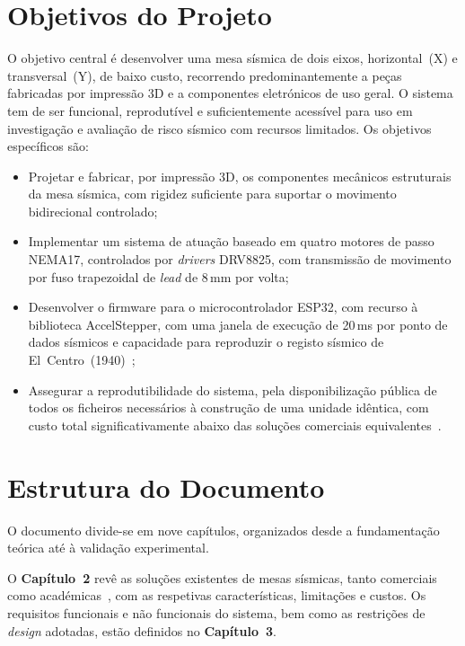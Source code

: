 \section{Objetivos do Projeto}
\label{sec:objetivos}

O objetivo central é desenvolver uma mesa sísmica de dois eixos, horizontal~(X) e transversal~(Y), de baixo custo, recorrendo predominantemente a peças fabricadas por impressão 3D e a componentes eletrónicos de uso geral. O sistema tem de ser funcional, reprodutível e suficientemente acessível para uso em investigação e avaliação de risco sísmico com recursos limitados. Os objetivos específicos são:

\begin{itemize}
    \item Projetar e fabricar, por impressão 3D, os componentes mecânicos estruturais da mesa sísmica, com rigidez suficiente para suportar o movimento bidirecional controlado;
    \item Implementar um sistema de atuação baseado em quatro motores de passo NEMA17, controlados por \textit{drivers} DRV8825, com transmissão de movimento por fuso trapezoidal de \textit{lead} de 8\,mm por volta;
    \item Desenvolver o firmware para o microcontrolador ESP32, com recurso à biblioteca AccelStepper, com uma janela de execução de 20\,ms por ponto de dados sísmicos e capacidade para reproduzir o registo sísmico de El~Centro~(1940)~\cite{Damci2018};
    \item Assegurar a reprodutibilidade do sistema, pela disponibilização pública de todos os ficheiros necessários à construção de uma unidade idêntica, com custo total significativamente abaixo das soluções comerciais equivalentes~\cite{QuanserShakeTableIIXY}.
\end{itemize}

\section{Estrutura do Documento}
\label{sec:estrutura}

O documento divide-se em nove capítulos, organizados desde a fundamentação teórica até à validação experimental.

O \textbf{Capítulo~2} revê as soluções existentes de mesas sísmicas, tanto comerciais~\cite{QuanserShakeTableIIXY, QuanserShakeTableIII} como académicas~\cite{Damci2018, Shakebot2022, 2DOF2025}, com as respetivas características, limitações e custos. Os requisitos funcionais e não funcionais do sistema, bem como as restrições de \textit{design} adotadas, estão definidos no \textbf{Capítulo~3}.

